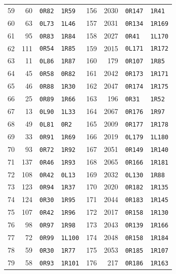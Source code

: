 \begin{longtable}{rrll@{\qquad}rrll}
59 & 60 & \texttt{0R82} & \texttt{1R59} & 156 & 2030 & \texttt{0R147} & \texttt{1R41}\\
60 & 63 & \texttt{0L73} & \texttt{1L46} & 157 & 2031 & \texttt{0R134} & \texttt{1R169}\\
61 & 95 & \texttt{0R83} & \texttt{1R84} & 158 & 2027 & \texttt{0R41} & \texttt{1L170}\\
62 & 111 & \texttt{0R54} & \texttt{1R85} & 159 & 2015 & \texttt{0L171} & \texttt{1R172}\\
63 & 11 & \texttt{0L86} & \texttt{1R87} & 160 & 179 & \texttt{0R107} & \texttt{1R85}\\
64 & 45 & \texttt{0R58} & \texttt{0R82} & 161 & 2042 & \texttt{0R173} & \texttt{1R171}\\
65 & 46 & \texttt{0R88} & \texttt{1R30} & 162 & 2047 & \texttt{0R174} & \texttt{1R175}\\
66 & 25 & \texttt{0R89} & \texttt{1R66} & 163 & 196 & \texttt{0R31} & \texttt{1R52}\\
67 & 13 & \texttt{0L90} & \texttt{1L33} & 164 & 2067 & \texttt{0R176} & \texttt{1R97}\\
68 & 49 & \texttt{0L81} & \texttt{0R2} & 165 & 2009 & \texttt{0R177} & \texttt{1R178}\\
69 & 33 & \texttt{0R91} & \texttt{1R69} & 166 & 2019 & \texttt{0L179} & \texttt{1L180}\\
70 & 93 & \texttt{0R72} & \texttt{1R92} & 167 & 2051 & \texttt{0R149} & \texttt{1R140}\\
71 & 137 & \texttt{0R46} & \texttt{1R93} & 168 & 2065 & \texttt{0R166} & \texttt{1R181}\\
72 & 108 & \texttt{0R42} & \texttt{0L13} & 169 & 2032 & \texttt{0L130} & \texttt{1R88}\\
73 & 123 & \texttt{0R94} & \texttt{1R37} & 170 & 2020 & \texttt{0R182} & \texttt{1R135}\\
74 & 124 & \texttt{0R30} & \texttt{1R95} & 171 & 2044 & \texttt{0R183} & \texttt{1R145}\\
75 & 107 & \texttt{0R42} & \texttt{1R96} & 172 & 2017 & \texttt{0R158} & \texttt{1R130}\\
76 & 98 & \texttt{0R97} & \texttt{1R98} & 173 & 2043 & \texttt{0R139} & \texttt{1R166}\\
77 & 72 & \texttt{0R99} & \texttt{1L100} & 174 & 2048 & \texttt{0R158} & \texttt{1R184}\\
78 & 59 & \texttt{0R30} & \texttt{1R77} & 175 & 2053 & \texttt{0R185} & \texttt{1R107}\\
79 & 58 & \texttt{0R93} & \texttt{1R101} & 176 & 217 & \texttt{0R186} & \texttt{1R163}\\

\end{longtable}
